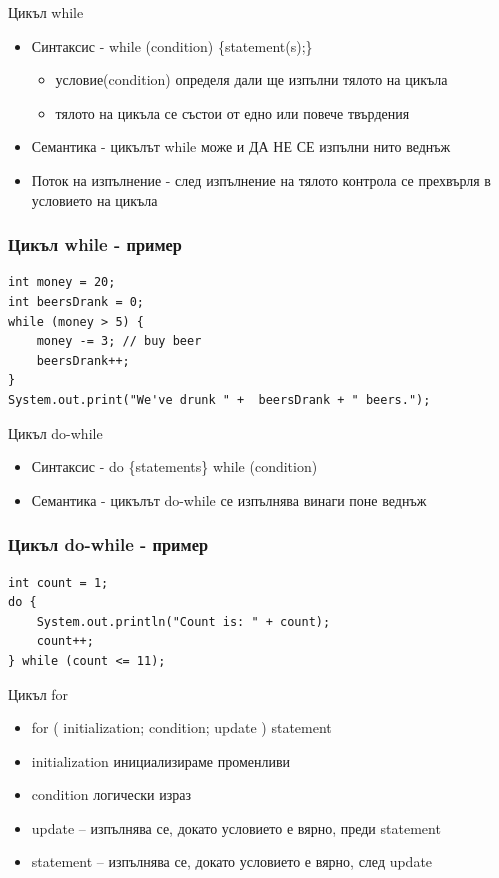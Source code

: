 \documentclass{beamer}
\begin{document}
\begin{frame}{Цикъл while}
  \transdissolve
  \begin{itemize}
  \item Синтаксис - while (condition) \{statement(s);\}
    \begin{itemize}
      \item условие(condition) определя дали ще изпълни тялото на цикъла
      \item тялото на цикъла се състои от едно или повече твърдения
    \end{itemize}

  \item Семантика - цикълът while може и ДА НЕ СЕ изпълни нито веднъж
  \item Поток на изпълнение - след изпълнение на тялото контрола се
    прехвърля в условието на цикъла
  \end{itemize}
\end{frame}

\begin{frame}[fragile]
  \frametitle{Цикъл while - пример}
  \transdissolve
\begin{lstlisting}
int money = 20;
int beersDrank = 0;
while (money > 5) {
    money -= 3; // buy beer
    beersDrank++;
}
System.out.print("We've drunk " +  beersDrank + " beers.");
\end{lstlisting}
\end{frame}

\begin{frame}{Цикъл do-while}
  \transdissolve
  \begin{itemize}
  \item Синтаксис - do \{statements\} while (condition)
  \item Семантика - цикълът do-while се изпълнява винаги поне веднъж
  \end{itemize}
\end{frame}

\begin{frame}[fragile]
  \frametitle{Цикъл do-while - пример}
  \transdissolve
\begin{lstlisting}
int count = 1;
do {
    System.out.println("Count is: " + count);
    count++;
} while (count <= 11);
\end{lstlisting}
\end{frame}

\begin{frame}{Цикъл for}
  \transdissolve
  \begin{itemize}
  \item for ( initialization; condition; update )  {statement}
  \item initialization инициализираме променливи
  \item condition логически израз
  \item update – изпълнява се, докато
    условието е вярно, преди statement
  \item statement – изпълнява се, докато
    условието е вярно, след update
  \end{itemize}
\end{frame}
\end{document}
